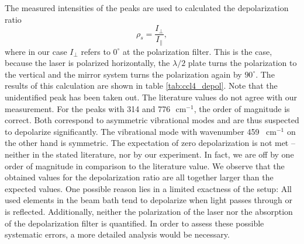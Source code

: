 The measured intensities of the peaks are used to calculated the depolarization ratio 
\begin{equation}
    \rho_s = \frac{I_\perp}{I_\parallel},   	
\end{equation}
where in our case $I_\perp$ refers to $0^\circ$ at the polarization filter. This is the case, because 
the laser is polarized horizontally, the $\lambda / 2$ plate turns the polarization to the vertical 
and the mirror system turns the polarization again by $90^\circ$. The results of this calculation 
are shown in table \ref{tab:ccl4_depol}. Note that the unidentified peak has been taken out. The
literature values do not agree with our measurement. For the peaks with 314 and 776 $\text{ cm}^{-1}$, 
the order of magnitude is correct. Both correspond to asymmetric vibrational modes and are thus suspected 
to depolarize significantly. The vibrational mode with wavenumber 459~$\text{ cm}^{-1}$ on the other 
hand is symmetric.\cite{zhang2012raman} 
The expectation of zero depolarization is not met -- neither in the stated literature, 
nor by our experiment. In fact, we are off by one order of magnitude in comparison to the literature value. 
We observe that the obtained values for the depolarization ratio are all together larger than the 
expected values. One possible reason lies in a limited exactness of the setup: All used elements in the 
beam bath tend to depolarize when light passes through or is reflected. Additionally, neither the 
polarization of the laser nor the absorption of the depolarization filter is quantified. 
In order to assess these possible systematic errors, a more detailed analysis would be necessary. 

